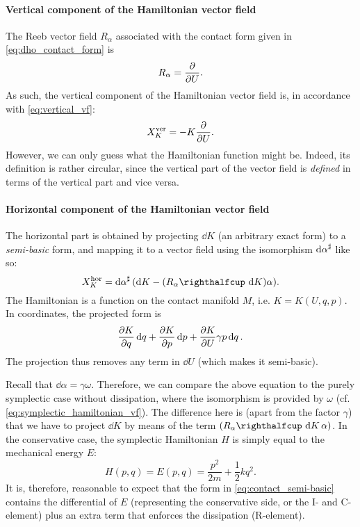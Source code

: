 \paragraph{Vertical component of the Hamiltonian vector field} The Reeb vector field \(R_\alpha\) associated with the contact form given in \cref{eq:dho_contact_form} is 
\begin{equation}
     R_\alpha = \pdv{}{U}.
\end{equation}
As such, the vertical component of the Hamiltonian vector field is, in accordance with \cref{eq:vertical_vf}:
\begin{equation}
    X_K^\text{ver} = -K\pdv{}{U}.
    \label{eq:dho_vertical}
\end{equation}
However, we can only guess what the Hamiltonian function might be. Indeed, its definition is rather circular, since the vertical part of the vector field is \emph{defined} in terms of the vertical part and vice versa.

\paragraph{Horizontal component of the Hamiltonian vector field} The horizontal part is obtained by projecting \(\dd{K}\) (an arbitrary exact form) to a \emph{semi-basic} form, and mapping it to a vector field using the isomorphism \(\dd{\alpha}^\sharp\) like so:
\begin{equation}
     X_K^\text{hor} = \fromDual{\dd{\alpha}}(\dd{K} - \qty(\intpr{R_\alpha}{\dd{K}})\alpha).
\end{equation}
The Hamiltonian is a function on the contact manifold \(M\), i.e. \(K = K(U, q, p)\). In coordinates, the projected form is
\begin{equation}
    \pdv{K}{q}\dd{q} + \pdv{K}{p}\dd{p} + \pdv{K}{U} \gamma p \dd{q}.
    \label{eq:contact_semi-basic}
\end{equation}
The projection thus removes any term in \(\dd{U}\) (which makes it semi-basic).

Recall that \(\dd{\alpha} = \gamma \omega \). Therefore, we can compare the above equation to the purely symplectic case without dissipation, where the isomorphism is provided by \(\omega\) (cf. \cref{eq:symplectic_hamiltonian_vf}). The difference here is (apart from the factor \(\gamma\)) that we have to project \(\dd{K}\) by means of the term \(\qty(\intpr{R_\alpha}{\dd{K}}\alpha)\). In the conservative case, the symplectic Hamiltonian $H$ is simply equal to the mechanical energy $E$:
\begin{equation}
    H(p, q) = E(p, q) = \frac{p^2}{2m} + \frac{1}{2}kq^2.
\end{equation}
It is, therefore, reasonable to expect that the form in \cref{eq:contact_semi-basic} contains the differential of \(E\) (representing the conservative side, or the I- and C-element) plus an extra term that enforces the dissipation (R-element). 

